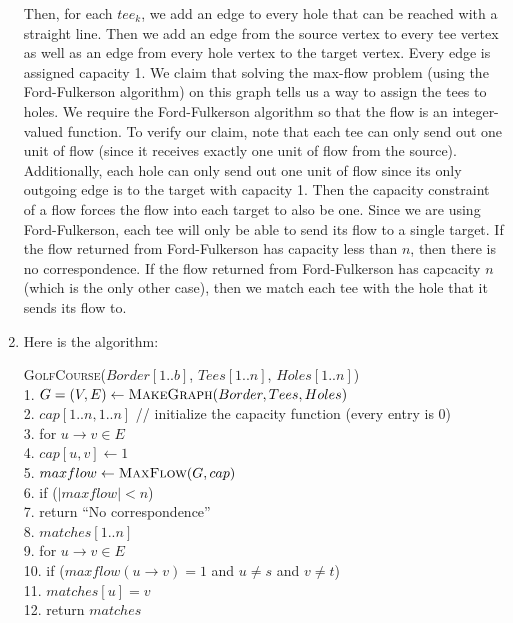 \documentclass{article}
\begin{document}
\begin{enumerate}
    Then, for each $tee_k$, we add an edge to every hole that can be reached with a straight line.
    Then we add an edge from the source vertex to every tee vertex as well as an edge from every hole vertex to the target vertex.
    Every edge is assigned capacity 1. \parspace
    We claim that solving the max-flow problem (using the Ford-Fulkerson algorithm) on this graph tells us a way to assign the tees to holes.
    We require the Ford-Fulkerson algorithm so that the flow is an integer-valued function.
    To verify our claim, note that each tee can only send out one unit of flow (since it receives exactly one unit of flow from the source).
    Additionally, each hole can only send out one unit of flow since its only outgoing edge is to the target with capacity 1.
    Then the capacity constraint of a flow forces the flow into each target to also be one.
    Since we are using Ford-Fulkerson, each tee will only be able to send its flow to a single target.
    If the flow returned from Ford-Fulkerson has capacity less than $n$, then there is no correspondence.
    If the flow returned from Ford-Fulkerson has capcacity $n$ (which is the only other case), then we match each tee with the hole that it sends its flow to.
    \item Here is the algorithm:
    \begin{algorithm}
        \textsc{GolfCourse}($Border[1..b]$, $Tees[1..n]$, $Holes[1..n]$) \\
        1. \hspace{1em} $G = (V,E) \gets \textsc{MakeGraph}(Border, Tees, Holes)$ \\
        2. \hspace{1em} $cap[1..n, 1..n]$   // initialize the capacity function (every entry is 0) \\
        3. \hspace{1em} for $u \to v \in E$ \\
        4. \hspace{2em}     $cap[u,v] \gets 1$ \\
        5. \hspace{1em} $maxflow \gets \textsc{MaxFlow}(G, cap)$ \\
        6. \hspace{1em} if ($|maxflow| < n$) \\
        7. \hspace{2em}     return ``No correspondence'' \\
        8. \hspace{1em} $matches[1..n]$ \\
        9. \hspace{1em} for $u \to v \in E$ \\
        10. \hspace{0.6em} if ($maxflow(u \to v) = 1$ and $u \neq s$ and $v \neq t$) \\
        11. \hspace{1.6em}     $matches[u] = v$ \\
        12. \hspace{0.6em} return $matches$ \\\\


\end{algorithm}
\end{enumerate}
\end{document}
